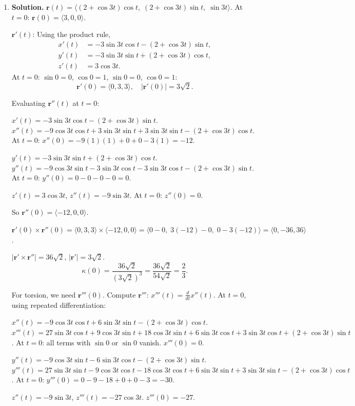 \begin{enumerate}
\item \textbf{Solution.}
$\mathbf{r}(t)=\langle (2+\cos 3t)\cos t,\;(2+\cos 3t)\sin t,\;\sin 3t\rangle$.
At $t=0$: $\mathbf{r}(0)=\langle 3,0,0\rangle$.

$\mathbf{r}'(t)$: Using the product rule,
\begin{align*}
x'(t) &= -3\sin 3t\cos t-(2+\cos 3t)\sin t,\\
y'(t) &= -3\sin 3t\sin t+(2+\cos 3t)\cos t,\\
z'(t) &= 3\cos 3t.
\end{align*}
At $t=0$: $\sin 0=0$, $\cos 0=1$, $\sin 0=0$, $\cos 0=1$:
\[
\mathbf{r}'(0)=\langle 0, 3, 3\rangle, \quad |\mathbf{r}'(0)|=3\sqrt{2}.
\]

Evaluating $\mathbf{r}''(t)$ at $t=0$:

$x'(t) = -3\sin 3t\cos t - (2+\cos 3t)\sin t$.
$x''(t) = -9\cos 3t\cos t + 3\sin 3t\sin t + 3\sin 3t\sin t - (2+\cos 3t)\cos t$.
At $t=0$: $x''(0) = -9(1)(1)+0+0-3(1)=-12$.

$y'(t) = -3\sin 3t\sin t + (2+\cos 3t)\cos t$.
$y''(t) = -9\cos 3t\sin t -3\sin 3t\cos t - 3\sin 3t\cos t -(2+\cos 3t)\sin t$.
At $t=0$: $y''(0) = 0-0-0-0=0$.

$z'(t) = 3\cos 3t$, $z''(t) = -9\sin 3t$.
At $t=0$: $z''(0)=0$.

So $\mathbf{r}''(0)=\langle -12, 0, 0\rangle$.

$\mathbf{r}'(0)\times\mathbf{r}''(0)=\langle 0,3,3\rangle\times\langle -12,0,0\rangle = \langle 0-0,\; 3(-12)-0,\; 0-3(-12)\rangle=\langle 0,-36,36\rangle$.

$|\mathbf{r}'\times\mathbf{r}''|=36\sqrt{2}$, $|\mathbf{r}'|=3\sqrt{2}$.
\[
\kappa(0)=\frac{36\sqrt{2}}{(3\sqrt{2})^3}=\frac{36\sqrt{2}}{54\sqrt{2}}=\frac{2}{3}.
\]

For torsion, we need $\mathbf{r}'''(0)$. Compute $\mathbf{r}'''$:
$x'''(t)=\frac{d}{dt}x''(t)$. At $t=0$, using repeated differentiation:

$x''(t) = -9\cos 3t\cos t + 6\sin 3t\sin t - (2+\cos 3t)\cos t$.
$x'''(t) = 27\sin 3t\cos t + 9\cos 3t\sin t + 18\cos 3t\sin t + 6\sin 3t\cos t + 3\sin 3t\cos t + (2+\cos 3t)\sin t$.
At $t=0$: all terms with $\sin 0$ or $\sin 0$ vanish. $x'''(0)=0$.

$y''(t) = -9\cos 3t\sin t - 6\sin 3t\cos t - (2+\cos 3t)\sin t$.
$y'''(t)=27\sin 3t\sin t - 9\cos 3t\cos t - 18\cos 3t\cos t + 6\sin 3t\sin t + 3\sin 3t\sin t - (2+\cos 3t)\cos t$.
At $t=0$: $y'''(0) = 0-9-18+0+0-3=-30$.

$z''(t)=-9\sin 3t$, $z'''(t)=-27\cos 3t$. $z'''(0)=-27$.


\end{enumerate}
